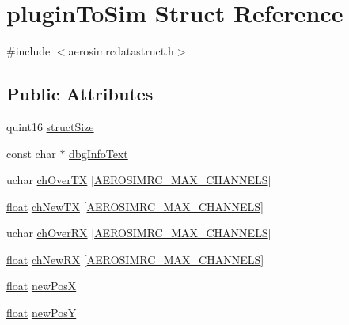 \hypertarget{structplugin_to_sim}{\section{plugin\-To\-Sim Struct Reference}
\label{structplugin_to_sim}
}


{\ttfamily \#include $<$aerosimrcdatastruct.\-h$>$}

\subsection*{Public Attributes}
\begin{DoxyCompactItemize}
\item 
quint16 \hyperlink{group___aero_sim_r_c_ga785b39329b27020e1525b4999a10d230}{struct\-Size}
\item 
const char $\ast$ \hyperlink{group___aero_sim_r_c_ga8d1dec1f6592d85b15941b3ce658f44a}{dbg\-Info\-Text}
\item 
uchar \hyperlink{group___aero_sim_r_c_ga77e9265e0ad99dcc6a7c5cc35da0481d}{ch\-Over\-T\-X} \mbox{[}\hyperlink{group___aero_sim_r_c_ga63f989ac10cdcbfefadc5e65055d3c7d}{A\-E\-R\-O\-S\-I\-M\-R\-C\-\_\-\-M\-A\-X\-\_\-\-C\-H\-A\-N\-N\-E\-L\-S}\mbox{]}
\item 
\hyperlink{_super_l_u_support_8h_a6a1bb6ed41f44b60e7bd83b0e9945aa7}{float} \hyperlink{group___aero_sim_r_c_ga69be322d9251f2d0881402e3bb8b79cc}{ch\-New\-T\-X} \mbox{[}\hyperlink{group___aero_sim_r_c_ga63f989ac10cdcbfefadc5e65055d3c7d}{A\-E\-R\-O\-S\-I\-M\-R\-C\-\_\-\-M\-A\-X\-\_\-\-C\-H\-A\-N\-N\-E\-L\-S}\mbox{]}
\item 
uchar \hyperlink{group___aero_sim_r_c_ga3fe5834da184407de8227a046d5a7de7}{ch\-Over\-R\-X} \mbox{[}\hyperlink{group___aero_sim_r_c_ga63f989ac10cdcbfefadc5e65055d3c7d}{A\-E\-R\-O\-S\-I\-M\-R\-C\-\_\-\-M\-A\-X\-\_\-\-C\-H\-A\-N\-N\-E\-L\-S}\mbox{]}
\item 
\hyperlink{_super_l_u_support_8h_a6a1bb6ed41f44b60e7bd83b0e9945aa7}{float} \hyperlink{group___aero_sim_r_c_gaa465d9eaa30d7a906bd3672768e5b380}{ch\-New\-R\-X} \mbox{[}\hyperlink{group___aero_sim_r_c_ga63f989ac10cdcbfefadc5e65055d3c7d}{A\-E\-R\-O\-S\-I\-M\-R\-C\-\_\-\-M\-A\-X\-\_\-\-C\-H\-A\-N\-N\-E\-L\-S}\mbox{]}
\item 
\hyperlink{_super_l_u_support_8h_a6a1bb6ed41f44b60e7bd83b0e9945aa7}{float} \hyperlink{group___aero_sim_r_c_ga2067141174f8fa27f36b9831b73b5668}{new\-Pos\-X}
\item 
\hyperlink{_super_l_u_support_8h_a6a1bb6ed41f44b60e7bd83b0e9945aa7}{float} \hyperlink{group___aero_sim_r_c_gab0bd49c25f923d60f12c350160c63f4f}{new\-Pos\-Y}

\end{DoxyCompactItemize}
